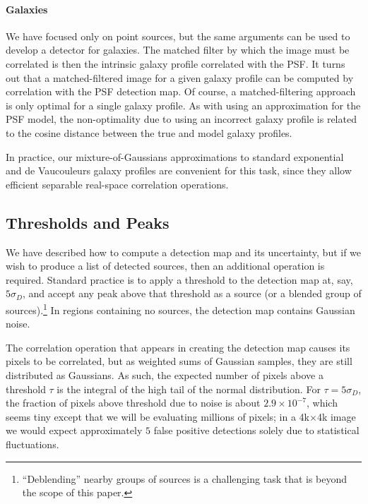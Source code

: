 \documentclass[11pt,letterpaper,linenumbers]{aastex7}
\newcommand{\sigd}{\sigma_{\scriptscriptstyle D}}
\begin{document}

\paragraph{Galaxies}
We have focused only on point sources, but the same arguments can be
used to develop a detector for galaxies.  The matched filter by which
the image must be correlated is then the intrinsic galaxy profile
correlated with the PSF.  It turns out \citep{zackay1} that a
matched-filtered image for a given galaxy profile can be computed by
correlation with the PSF detection map.
Of course, a matched-filtering approach is only optimal
for a single galaxy profile.  As with using an approximation for the
PSF model, the non-optimality due to using an incorrect galaxy profile
is related to the cosine distance between the true and model galaxy
profiles.

In practice, our mixture-of-Gaussians approximations to standard
exponential and de Vaucouleurs galaxy profiles \citep{gaussgals} are
convenient for this task, since they allow efficient separable
real-space correlation operations.


\subsection{Thresholds and Peaks}
\label{sec:thresholds}

We have described how to compute a detection map and its uncertainty,
but if we wish to produce a list of detected sources, then an
additional operation is required.  Standard practice is to apply a
threshold to the detection map at, say, $5 \sigd$, and accept any
peak above that threshold as a source (or a blended group of
sources).\footnote{``Deblending'' nearby groups of sources is a
  challenging task that is beyond the scope of this paper.}  In
regions containing no sources, the detection map contains Gaussian
noise.


The correlation operation that appears in creating the detection map
causes its pixels to be correlated, but as weighted sums of Gaussian
samples, they are still distributed as Gaussians.  As such, the
expected number of pixels above a threshold $\tau$ is the integral of
the high tail of the normal distribution.  For $\tau = 5 \sigd$,
the fraction of pixels above threshold due to noise is about
$2.9\times10^{-7}$, which seems tiny except that we will be evaluating
millions of pixels; in a 4k$\times$4k image we would expect
approximately $5$ false positive detections solely due to statistical
fluctuations.
\end{document}
